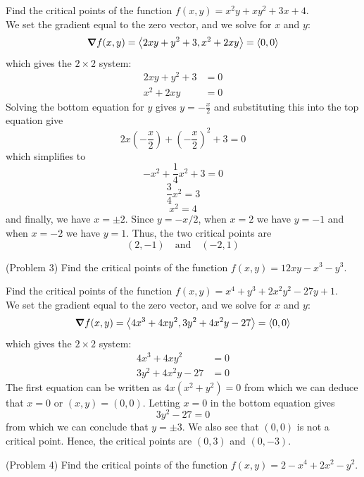 \documentclass[handout]{ximera}
\begin{document}
\begin{example}[Example 3]
Find the critical points of the function $f(x,y) = x^2y +xy^2 +3x + 4$.\\
We set the gradient equal to the zero vector, and we solve for $x$ and $y$:
\[
\boldsymbol\nabla f(x,y) = \left\langle 2xy + y^2 + 3, x^2 + 2xy\right\rangle = \left\langle 0,0\right\rangle
\]
which gives the $2 \times 2$ system:
\begin{align*}
2xy + y^2 +3  &= 0\\
x^2 + 2xy & = 0
\end{align*}
Solving the bottom equation for $y$ gives $y = -\frac{x}{2}$ and substituting this into the top equation give
\[
2x\left(-\frac{x}{2}\right) + \left(-\frac{x}{2}\right)^2 +3 = 0
\]
which simplifies to
\[
-x^2 + \frac14 x^2 + 3 =0
\]
\[
\frac34 x^2 = 3
\]
\[
x^2 = 4
\]
and finally, we have $x=\pm 2$. Since $y = -x/2$, when $x=2$ we have $y=-1$ and when $x = -2$ we have $y = 1$.
Thus, the two critical points are
\[
(2,-1) \quad \text{and} \quad (-2, 1)
\]
\end{example}

\begin{problem}(Problem 3)
Find the critical points of the function $f(x,y) = 12xy - x^3 - y^3$.
\end{problem}



\begin{example}[Example 4]
Find the critical points of the function $f(x,y) = x^4 + y^3 + 2x^2y^2 -27y + 1$.\\
We set the gradient equal to the zero vector, and we solve for $x$ and $y$:
\[
\boldsymbol\nabla f(x,y) = \left\langle 4x^3 + 4xy^2, 3y^2 + 4x^2y -27\right\rangle = \left\langle 0,0\right\rangle
\]
which gives the $2 \times 2$ system:
\begin{align*}
4x^3 + 4xy^2 &= 0\\
3y^2 + 4x^2y -27 &= 0
\end{align*}
The first equation can be written as $4x(x^2 + y^2) = 0$ from which we can deduce that $x = 0$ or $(x, y) = (0,0)$. 
Letting $x = 0$ in the bottom equation gives
\[
3y^2 - 27 = 0
\]
from which we can conclude that $y = \pm 3$. We also see that $(0,0)$ is not a critical point.
Hence, the critical points are $(0, 3)$ and $(0, -3)$.
\end{example}

\begin{problem}(Problem 4)
Find the critical points of the function $f(x,y) = 2-x^4 + 2x^2 - y^2$.
\end{problem}
\end{document}
